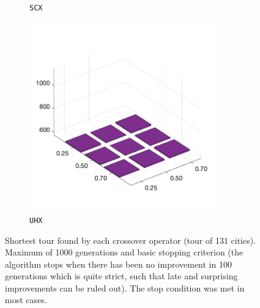 \begin{figure}[H]
\begin{subfigure}[b]{0.25\textwidth}
		\caption{\texttt{SCX}}
		\label{fig:y}
    	\end{subfigure}
%
	\begin{subfigure}[b]{0.25\textwidth}
		\centering
		\includegraphics[width=0.9\textwidth]{crossover/min/cross_unnamed_4.png}
		\caption{\texttt{UHX}}
		\label{fig:z}
    	\end{subfigure}
	\caption{Shortest tour found by each crossover operator (tour of 131 cities). Maximum of 1000 generations and basic stopping criterion (the algorithm stops when there has been no improvement in 100 generations which is quite strict, such that late and surprising improvements can be ruled out). The stop condition was met in most cases.}
	\label{fig:rescross4}
\end{figure}


